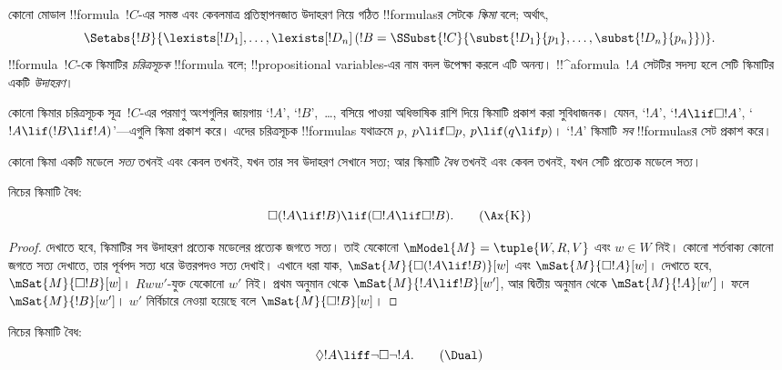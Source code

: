 \documentclass[../../../include/open-logic-section]{subfiles}
\begin{document}


\begin{defn}
  কোনো মোডাল !!{formula}~$!C$-এর সমস্ত এবং কেবলমাত্র প্রতিস্থাপনজাত
  উদাহরণ নিয়ে গঠিত !!{formula}sর সেটকে \emph{স্কিমা} বলে; অর্থাৎ,
  \[
  \Setabs{!B}{\lexists[!D_1], \dots, \lexists[!D_n] \left(!B =
  \SSubst{!C}{\subst{!D_1}{p_1}, \dots, \subst{!D_n}{p_n}} \right) }.
  \]
  !!{formula}~$!C$-কে স্কিমাটির \emph{চরিত্রসূচক} !!{formula} বলে;
  !!{propositional
  variable}s-এর নাম বদল উপেক্ষা করলে এটি অনন্য।
  !!^a{formula}~$!A$ সেটটির সদস্য হলে সেটি স্কিমাটির একটি
  \emph{উদাহরণ}।
\end{defn}

কোনো স্কিমার চরিত্রসূচক সূত্র~$!C$-এর পরমাণু অংশগুলির জায়গায়
`$!A$', `$!B$',~\dots, বসিয়ে পাওয়া অধিভাষিক রাশি দিয়ে স্কিমাটি
প্রকাশ করা সুবিধাজনক। যেমন, `$!A$', `$!A \lif \Box!A$',
`$!A \lif (!B \lif !A)$'—এগুলি স্কিমা প্রকাশ করে। এদের চরিত্রসূচক
!!{formula}s যথাক্রমে $p$, $p \lif \Box p$, $p \lif (q
\lif p)$। `$!A$' স্কিমাটি \emph{সব} !!{formula}sর সেট প্রকাশ করে।

\begin{defn}
  কোনো স্কিমা একটি মডেলে \emph{সত্য} তখনই এবং কেবল তখনই, যখন তার সব
  উদাহরণ সেখানে সত্য; আর স্কিমাটি \emph{বৈধ} তখনই এবং কেবল তখনই,
  যখন সেটি প্রত্যেক মডেলে সত্য।
\end{defn}

\begin{prop}
  নিচের  স্কিমাটি বৈধ:
  \begin{equation*}
  \Box(!A \lif !B) \lif (\Box !A \lif \Box !B). \tag{\Ax{K}}
  \end{equation*}
\end{prop}

\begin{proof}
  দেখাতে হবে, স্কিমাটির সব উদাহরণ প্রত্যেক মডেলের প্রত্যেক জগতে সত্য।
  তাই যেকোনো $\mModel{M} = \tuple{W,R,V}$ এবং $w \in W$ নিই।
  কোনো শর্তবাক্য কোনো জগতে সত্য দেখাতে, তার পূর্বপদ সত্য ধরে উত্তরপদও
  সত্য দেখাই। এখানে ধরা যাক, $\mSat{M}{\Box(!A \lif !B)}[w]$ এবং
  $\mSat{M}{\Box !A}[w]$। দেখাতে হবে, $\mSat{M}{\Box !B}[w]$।
  $Rww'$-যুক্ত যেকোনো $w'$ নিই। প্রথম অনুমান থেকে
  $\mSat{M}{!A \lif !B}[w']$, আর দ্বিতীয় অনুমান থেকে
  $\mSat{M}{!A}[w']$। ফলে $\mSat{M}{!B}[w']$। $w'$
  নির্বিচারে নেওয়া হয়েছে বলে $\mSat{M}{\Box !B}[w]$।
\end{proof}

\begin{prop}
  নিচের \Dual{} স্কিমাটি বৈধ:
  \begin{equation*}
  \Diamond !A \liff \lnot\Box\lnot !A. \tag{\Dual}
  \end{equation*}
\end{prop}
\end{document}
